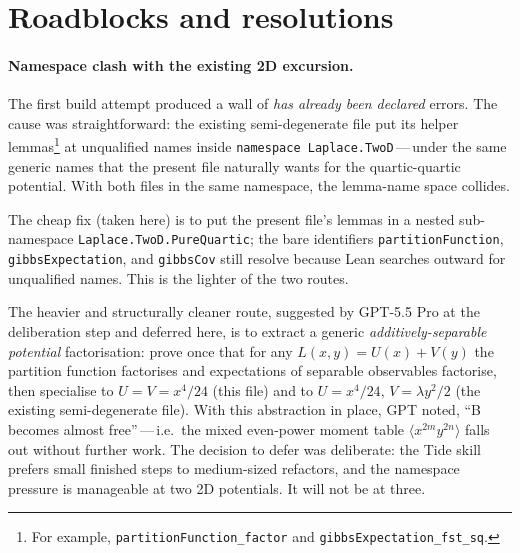 \documentclass[11pt]{article}
\begin{document}
\section{Roadblocks and resolutions}

\paragraph{Namespace clash with the existing 2D excursion.}
The first build attempt produced a wall of \emph{has already been
declared} errors. The cause was straightforward: the existing
semi-degenerate file put its helper lemmas\footnote{For example,
\texttt{partitionFunction\_factor} and
\texttt{gibbsExpectation\_fst\_sq}.} at unqualified names inside
\texttt{namespace Laplace.TwoD}\,---\,under the same generic names that
the present file naturally wants for the quartic-quartic potential.
With both files in the same namespace, the lemma-name space collides.

The cheap fix (taken here) is to put the present file's lemmas in a
nested sub-namespace \texttt{Laplace.TwoD.PureQuartic}; the bare
identifiers \texttt{partitionFunction}, \texttt{gibbsExpectation}, and
\texttt{gibbsCov} still resolve because Lean searches outward for
unqualified names. This is the lighter of the two routes.

The heavier and structurally cleaner route, suggested by GPT-5.5 Pro at
the deliberation step and deferred here, is to extract a generic
\emph{additively-separable potential} factorisation: prove once that for
any $L(x,y) = U(x) + V(y)$ the partition function factorises and
expectations of separable observables factorise, then specialise to
$U = V = x^4/24$ (this file) and to $U = x^4/24,\,V = \lambda y^2/2$
(the existing semi-degenerate file). With this abstraction in place,
GPT noted, ``B becomes almost free''\,---\,i.e.\ the mixed even-power
moment table $\langle x^{2m} y^{2n}\rangle$ falls out without further
work. The decision to defer was deliberate: the Tide skill prefers
small finished steps to medium-sized refactors, and the namespace
pressure is manageable at two 2D potentials. It will not be at three.
\end{document}
